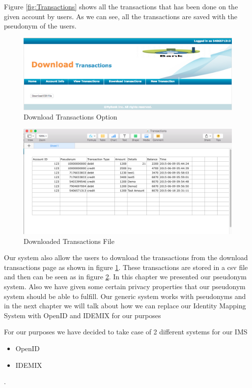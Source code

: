 Figure \ref{fig:Transactions} shows all the transactions that has been done on the given account by users. As we can see, all the transactions are saved with the pseudonym of the users.
\begin{figure}[h]
	\centering
	\includegraphics[width=\textwidth]{figures/Download}
	\caption{Download Transactions Option}
	\label{fig:Download}
\end{figure}
\begin{figure}[h]
	\centering
	\includegraphics[width=\textwidth]{figures/File}
	\caption{Downloaded Transactions File}
	\label{fig:File}
\end{figure}	
Our system also allow the users to download the transactions from the download transactions page as shown in figure \ref{fig:Download}. These transactions are stored in a csv file and then can be seen as in figure \ref{fig:File}.
\FloatBarrier
In this chapter we presented our pseudonym system. Also we have given some certain privacy properties that our pseudonym system should be able to fulfill. Our generic system works with pseudonyms and in the next chapter we will talk about how we can replace our Identity Mapping System with OpenID and IDEMIX for our purposes

For our purposes we have decided to take case of 2 different systems for our IMS
\begin{itemize}
	\item OpenID
	\item IDEMIX
\end{itemize}.